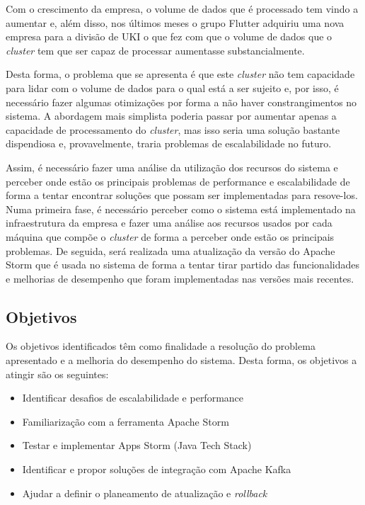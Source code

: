 Com o crescimento da empresa, o volume de dados que é processado tem vindo a aumentar e, além disso,
nos últimos meses o grupo Flutter adquiriu uma nova empresa para a divisão de \ac{UKI} o que fez 
com que o volume de dados que o \textit{cluster} tem que ser capaz de processar aumentasse 
substancialmente.

Desta forma, o problema que se apresenta é que este \textit{cluster} não tem capacidade para lidar
com o volume de dados para o qual está a ser sujeito e, por isso, é necessário fazer algumas
otimizações por forma a não haver constrangimentos no sistema. A abordagem mais simplista poderia 
passar por aumentar apenas a capacidade de processamento do \textit{cluster}, mas isso seria uma 
solução bastante dispendiosa e, provavelmente, traria problemas de escalabilidade no futuro.

Assim, é necessário fazer uma análise da utilização dos recursos do sistema e perceber onde estão 
os principais problemas de performance e escalabilidade de forma a tentar encontrar soluções que 
possam ser implementadas para resove-los. Numa primeira fase, é necessário perceber como o sistema 
está implementado na infraestrutura da empresa e fazer uma análise aos recursos usados por cada 
máquina que compõe o \textit{cluster} de forma a perceber onde estão os principais problemas. De 
seguida, será realizada uma atualização da versão do Apache Storm que é usada no sistema de forma 
a tentar tirar partido das funcionalidades e melhorias de desempenho que foram implementadas nas 
versões mais recentes.

\subsection{Objetivos}

Os objetivos identificados têm como finalidade a resolução do problema apresentado e a melhoria do
desempenho do sistema. Desta forma, os objetivos a atingir são os seguintes:

\begin{itemize}
  \item Identificar desafios de escalabilidade e performance
  \item Familiarização com a ferramenta Apache Storm 
  \item Testar e implementar Apps Storm (Java Tech Stack) 
  \item Identificar e propor soluções de integração com Apache Kafka 
  \item Ajudar a definir o planeamento de atualização e \textit{rollback}
\end{itemize}

